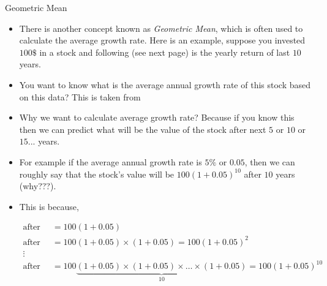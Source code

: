 \documentclass[8pt, usepdftitle=false]{beamer}
\begin{document}
\begin{frame}{Geometric Mean}

\begin{itemize}

  \item There is another concept known as \emph{Geometric Mean}, which is often used to calculate the \alert{average growth rate}. Here is an example, suppose you invested $100\$$ in a stock and following (see next page) is the yearly return of last $10$ years.

  \item You want to know what is the average annual growth rate of this stock based on this data? This is taken from \citet*{anderson_statistics_2020}

  \item Why we want to calculate average growth rate? Because if you know this then we can predict what will be the value of the stock after next $5$ or $10$ or $15$... years.

  \item For example if the average annual growth rate is $5\%$ or $0.05$, then we can roughly say that the stock's value will be $100(1 + 0.05)^{10}$ after $10$ years (why???).

  \item This is because, 

  \begin{align*}
    \text{after one year } & = 100(1 + 0.05) \\
    \text{after two years } & = 100(1 + 0.05) \times (1 + 0.05) = 100(1 + 0.05)^2   \\
    \vdots\\
    \text{after ten years } & = 100\underbrace{(1 + 0.05) \times (1 + 0.05) \times \ldots \times (1 + 0.05)}_{10} = 100(1 + 0.05)^{10}   \\
  \end{align*}


\end{itemize}
  
\end{frame}
\end{document}
